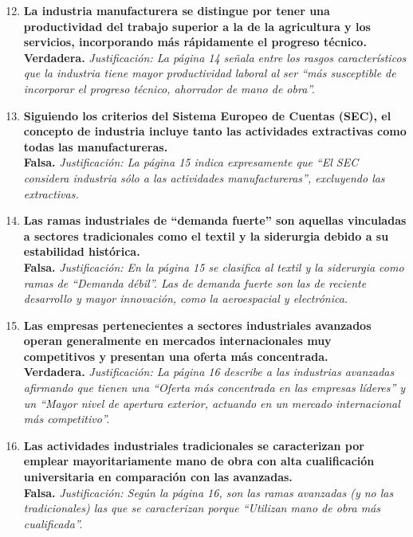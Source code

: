 \begin{enumerate}[label=\textbf{\arabic*.}]
    \setcounter{enumi}{11}

    \item \textbf{La industria manufacturera se distingue por tener una productividad del trabajo superior a la de la agricultura y los servicios, incorporando más rápidamente el progreso técnico.} \\
    \textbf{Verdadera.} \textit{Justificación: La página 14 señala entre los rasgos característicos que la industria tiene mayor productividad laboral al ser ``más susceptible de incorporar el progreso técnico, ahorrador de mano de obra''.}

    \item \textbf{Siguiendo los criterios del Sistema Europeo de Cuentas (SEC), el concepto de industria incluye tanto las actividades extractivas como todas las manufactureras.} \\
    \textbf{Falsa.} \textit{Justificación: La página 15 indica expresamente que ``El SEC considera industria sólo a las actividades manufactureras'', excluyendo las extractivas.}

    \item \textbf{Las ramas industriales de ``demanda fuerte'' son aquellas vinculadas a sectores tradicionales como el textil y la siderurgia debido a su estabilidad histórica.} \\
    \textbf{Falsa.} \textit{Justificación: En la página 15 se clasifica al textil y la siderurgia como ramas de ``Demanda débil''. Las de demanda fuerte son las de reciente desarrollo y mayor innovación, como la aeroespacial y electrónica.}

    \item \textbf{Las empresas pertenecientes a sectores industriales avanzados operan generalmente en mercados internacionales muy competitivos y presentan una oferta más concentrada.} \\
    \textbf{Verdadera.} \textit{Justificación: La página 16 describe a las industrias avanzadas afirmando que tienen una ``Oferta más concentrada en las empresas líderes'' y un ``Mayor nivel de apertura exterior, actuando en un mercado internacional más competitivo''.}

    \item \textbf{Las actividades industriales tradicionales se caracterizan por emplear mayoritariamente mano de obra con alta cualificación universitaria en comparación con las avanzadas.} \\
    \textbf{Falsa.} \textit{Justificación: Según la página 16, son las ramas avanzadas (y no las tradicionales) las que se caracterizan porque ``Utilizan mano de obra más cualificada''.}

\end{enumerate}

